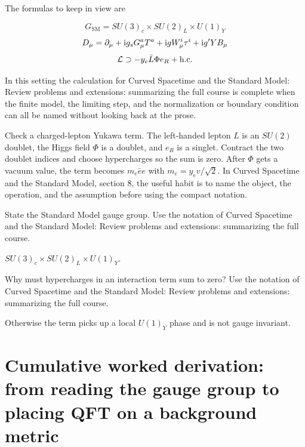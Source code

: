 The formulas to keep in view are

\[
  G_{\mathrm{SM}}=SU(3)_c\times SU(2)_L\times U(1)_Y
\]
\[
  D_\mu=\partial_\mu+\mathrm i g_sG_\mu^aT^a+\mathrm i gW_\mu^i\tau^i+\mathrm i g'YB_\mu
\]
\[
  \mathcal L\supset -y_e\bar L\Phi e_R+\hbox{h.c.}
\]

In this setting the calculation for Curved Spacetime and the Standard Model: Review problems and extensions: summarizing the full course is complete when the finite model, the limiting step, and the normalization or boundary condition can all be named without looking back at the prose.




\begin{example}
Check a charged-lepton Yukawa term.  The left-handed lepton \(L\) is an \(SU(2)\) doublet, the Higgs field \(\Phi\) is a doublet, and \(e_R\) is a singlet.  Contract the two doublet indices and choose hypercharges so the sum is zero.  After \(\Phi\) gets a vacuum value, the term becomes \(m_e\bar e e\) with \(m_e=y_ev/\sqrt2\).  In Curved Spacetime and the Standard Model, section 8, the useful habit is to name the object, the operation, and the assumption before using the compact notation.
\end{example}



\begin{exercise}
State the Standard Model gauge group.  Use the notation of Curved Spacetime and the Standard Model: Review problems and extensions: summarizing the full course.
\begin{answer}
\(SU(3)_c\times SU(2)_L\times U(1)_Y\).
\end{answer}
\end{exercise}

\begin{exercise}
Why must hypercharges in an interaction term sum to zero?  Use the notation of Curved Spacetime and the Standard Model: Review problems and extensions: summarizing the full course.
\begin{answer}
Otherwise the term picks up a local \(U(1)_Y\) phase and is not gauge invariant.
\end{answer}
\end{exercise}



\section{Cumulative worked derivation: from reading the gauge group to placing QFT on a background metric}

